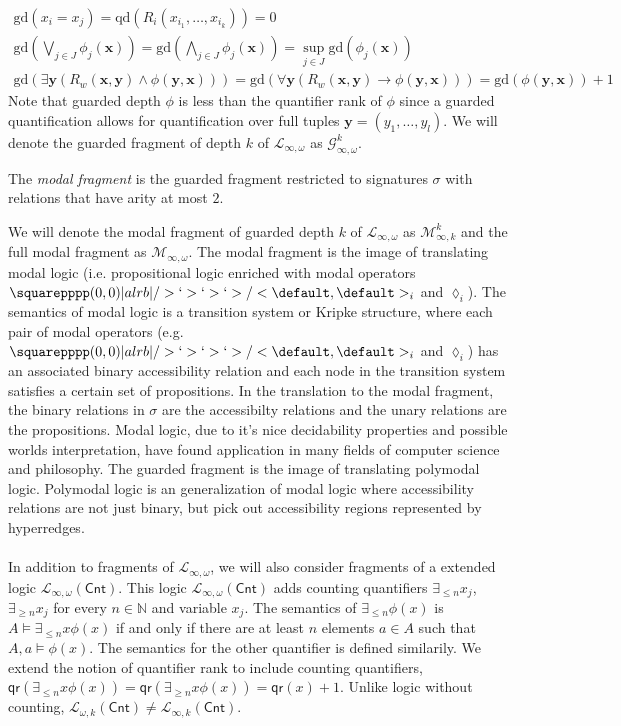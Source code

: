 \begin{eqnarray*}
\text{gd}(x_{i} = x_{j}) = \text{qd}(R_{i}(x_{i_{1}},\dots,x_{i_{k}})) = 0 \\
\text{gd}(\bigvee_{j \in J} \phi_{j}(\mathbf{x})) = \text{gd}(\bigwedge_{j \in J} \phi_{j}(\mathbf{x}))  = \sup_{j \in J} \text{gd}(\phi_{j}(\mathbf{x})) \\
\text{gd}(\exists \mathbf{y} (R_{w}(\mathbf{x},\mathbf{y}) \wedge \phi(\mathbf{y},\mathbf{x}))) = \text{gd}(\forall \mathbf{y}(R_{w}(\mathbf{x},\mathbf{y}) \rightarrow \phi(\mathbf{y},\mathbf{x}))) = \text{gd}(\phi(\mathbf{y},\mathbf{x})) + 1 
\end{eqnarray*}
Note that guarded depth $\phi$ is less than the quantifier rank of $\phi$ since a guarded quantification allows for quantification over full tuples $\mathbf{y} = (y_{1},\dots,y_{l})$. We will denote the guarded fragment of depth $k$ of $\mathcal{L}_{\infty,\omega}$ as $\mathcal{G}^{k}_{\infty,\omega}$.
\begin{defn}
The \textit{modal fragment} is the guarded fragment restricted to signatures $\sigma$ with relations that have arity at most $2$. 
\end{defn}
We will denote the modal fragment of guarded depth $k$ of $\mathcal{L}_{\infty,\omega}$ as $\mathcal{M}^{k}_{\infty,k}$ and the full modal fragment as $\mathcal{M}_{\infty,\omega}$. 
The modal fragment is the image of translating modal logic (i.e. propositional logic enriched with modal operators $\amssquare_{i}$ and $\lozenge_{i}$). The semantics of modal logic is a transition system or Kripke structure, where each pair of modal operators (e.g. $\amssquare_{i}$ and $\lozenge_{i}$) has an associated binary accessibility relation and each node in the transition system satisfies a certain set of propositions. In the translation to the modal fragment, the binary relations in $\sigma$ are the accessibilty relations and the unary relations are the propositions. Modal logic, due to it's nice decidability properties and possible worlds interpretation, have found application in many fields of computer science and philosophy. The guarded fragment is the image of translating polymodal logic. Polymodal logic is an generalization of modal logic where accessibility relations are not just binary, but pick out accessibility regions represented by hyperredges. \\~\\    
In addition to fragments of $\mathcal{L}_{\infty,\omega}$, we will also consider fragments of a extended logic $\mathcal{L}_{\infty,\omega}(\mathsf{Cnt})$. This logic $\mathcal{L}_{\infty,\omega}(\mathsf{Cnt})$ adds counting quantifiers $\exists_{\leq n}x_{j}$, $\exists_{\geq n}x_{j}$ for every $n \in \mathbb{N}$ and variable $x_{j}$. The semantics of $\exists_{\leq n}\phi(x)$ is $A \vDash \exists_{\leq n}x \phi(x)$ if and only if there are at least $n$ elements $a \in A$ such that $A,a \vDash \phi(x)$. The semantics for the other quantifier is defined similarily. We extend the notion of quantifier rank to include counting quantifiers, $\mathsf{qr}(\exists_{\leq n}x\phi(x)) = \mathsf{qr}(\exists_{\geq n}x\phi(x)) = \mathsf{qr}(x) + 1$. Unlike logic without counting, $\mathcal{L}_{\omega,k}(\mathsf{Cnt}) \not= \mathcal{L}_{\infty,k}(\mathsf{Cnt})$. 
